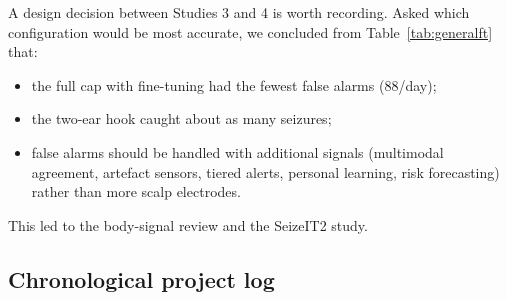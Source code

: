 A design decision between Studies 3 and 4 is worth recording. Asked which configuration would be most accurate, we concluded from Table~\ref{tab:generalft} that:
\begin{itemize}
\item the full cap with fine-tuning had the fewest false alarms (88/day);
\item the two-ear hook caught about as many seizures;
\item false alarms should be handled with additional signals (multimodal agreement, artefact sensors, tiered alerts, personal learning, risk forecasting) rather than more scalp electrodes.
\end{itemize}
This led to the body-signal review and the SeizeIT2 study.

\subsection{Chronological project log}

